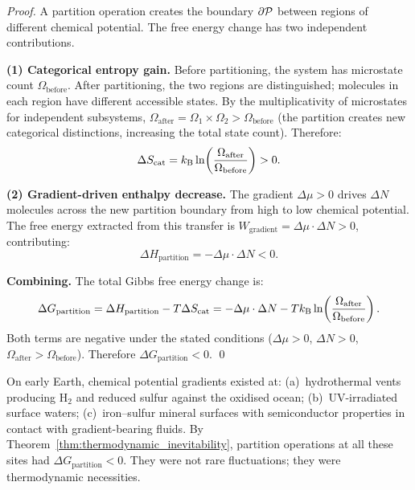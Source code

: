 \begin{proof}
A partition operation creates the boundary $\partial\mathcal{P}$ between regions of
different chemical potential. The free energy change has two independent
contributions.

\noindent\textbf{(1) Categorical entropy gain.} Before partitioning, the system
has microstate count $\Omega_{\mathrm{before}}$. After partitioning, the two
regions are distinguished; molecules in each region have different accessible
states. By the multiplicativity of microstates for independent subsystems,
$\Omega_{\mathrm{after}} = \Omega_1 \times \Omega_2 > \Omega_{\mathrm{before}}$
(the partition creates new categorical distinctions, increasing the total state
count). Therefore:
\begin{equation}
  \Delta S_{\mathrm{cat}} = k_{\mathrm{B}} \ln\!\left(\frac{\Omega_{\mathrm{after}}}{\Omega_{\mathrm{before}}}\right) > 0.
  \label{eq:ds_cat_partition}
\end{equation}

\noindent\textbf{(2) Gradient-driven enthalpy decrease.} The gradient $\Delta\mu > 0$
drives $\Delta N$ molecules across the new partition boundary from high to low
chemical potential. The free energy extracted from this transfer is
$W_{\mathrm{gradient}} = \Delta\mu \cdot \Delta N > 0$, contributing:
\begin{equation}
  \Delta H_{\mathrm{partition}} = -\Delta\mu \cdot \Delta N < 0.
  \label{eq:dh_partition}
\end{equation}

\noindent\textbf{Combining.} The total Gibbs free energy change is:
\begin{equation}
  \Delta G_{\mathrm{partition}} = \Delta H_{\mathrm{partition}} - T\Delta S_{\mathrm{cat}}
  = -\Delta\mu \cdot \Delta N - Tk_{\mathrm{B}} \ln\!\left(\frac{\Omega_{\mathrm{after}}}{\Omega_{\mathrm{before}}}\right).
  \label{eq:dg_full}
\end{equation}
Both terms are negative under the stated conditions ($\Delta\mu > 0$, $\Delta N > 0$,
$\Omega_{\mathrm{after}} > \Omega_{\mathrm{before}}$). Therefore $\Delta G_{\mathrm{partition}} < 0$.
\qed
\end{proof}

\begin{corollary}
\label{cor:early_earth_inevitability}
On early Earth, chemical potential gradients existed at: (a)~hydrothermal vents
producing H$_2$ and reduced sulfur against the oxidised ocean;
(b)~UV-irradiated surface waters; (c)~iron--sulfur mineral surfaces with
semiconductor properties in contact with gradient-bearing fluids. By
Theorem~\ref{thm:thermodynamic_inevitability}, partition operations at all these
sites had $\Delta G_{\mathrm{partition}} < 0$. They were not rare fluctuations;
they were thermodynamic necessities.
\end{corollary}

